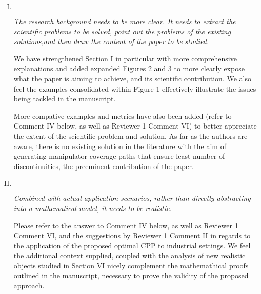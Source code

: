 \documentclass[11pt]{article}
\newenvironment{reviewer}
{\begin{mdframed}[roundcorner = 10pt,fontcolor=blue!70!black]\itshape}
{\end{mdframed}}
\begin{document}
\begin{enumerate}[I.]
 \item $ $
  \begin{reviewer}
    The research background needs to be more clear. It needs to extract the scientific problems to be solved, point out the problems of the existing solutions,and then draw the content of the paper to be studied.
    \end{reviewer}
  \noindent We have strengthened Section I in particular with more comprehensive explanations and added expanded Figures 2 and 3 to more clearly expose what the paper is aiming to achieve, and its scientific contribution. We also feel the examples consolidated within Figure 1 effectively illustrate 
the issues being tackled in the manuscript. 

More compative examples and metrics have also been added (refer to Comment IV below, as well as Reviewer 1 Comment VI) to better appreciate the extent of the scientific problem and solution. 
As far as the authors are aware, there is no existing solution in the literature with the aim of generating manipulator coverage paths that ensure least number of discontinuities, the preeminent contribution of the paper. 
 
  
  \item $ $
  \begin{reviewer}
    Combined with actual application scenarios, rather than directly abstracting into a mathematical model, it needs to be realistic.
   \end{reviewer}
  \noindent Please refer to the answer to Comment IV below, as well as Reviewer 1 Comment VI, and the suggestions by Reviewer 1 Comment II in regards to the application of the proposed optimal CPP to industrial settings. 
We feel the additional context supplied, coupled with the analysis of new realistic objects studied in Section VI  nicely complement the  mathemathical proofs outlined in the manuscript, necessary to prove the validity of the proposed approach.
  

\end{enumerate}
\end{document}
